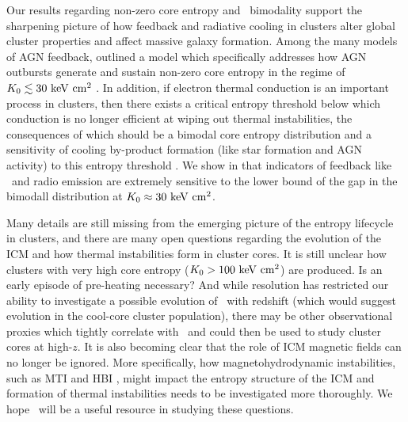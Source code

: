 \documentclass[12pt,preprint]{aastex}
\begin{document}
Our results regarding non-zero core entropy and \kna\ bimodality
support the sharpening picture of how feedback and radiative cooling
in clusters alter global cluster properties and affect massive galaxy
formation. Among the many models of AGN feedback, \citet{agnframework}
outlined a model which specifically addresses how AGN outbursts
generate and sustain non-zero core entropy in the regime of $K_0 \lesssim
30 \mathrm{\mbox{\ensuremath{\mathrm{~keV}}} \mathrm{\mbox{\ensuremath{\mathrm{~cm}}}^2}}$ \citep[see also][]{kaiser03}. In addition, if electron
thermal conduction is an important process in clusters, then there
exists a critical entropy threshold below which conduction is no
longer efficient at wiping out thermal instabilities, the consequences
of which should be a bimodal core entropy distribution and a
sensitivity of cooling by-product formation (like star formation and
AGN activity) to this entropy threshold \citep{conduction,
  2008arXiv0804.3823G}. We show in \citet{haradent} that indicators of
feedback like \halpha\ and radio emission are extremely sensitive to
the lower bound of the gap in the bimodall distribution at $K_0
\approx 30 \mathrm{\mbox{\ensuremath{\mathrm{~keV}}} \mathrm{\mbox{\ensuremath{\mathrm{~cm}}}^2}}$.

Many details are still missing from the emerging picture of the
entropy lifecycle in clusters, and there are many open questions
regarding the evolution of the ICM and how thermal instabilities form
in cluster cores. It is still unclear how clusters with very high core
entropy ($K_0 > 100 \mathrm{\mbox{\ensuremath{\mathrm{~keV}}} \mathrm{\mbox{\ensuremath{\mathrm{~cm}}}^2}}$) are produced. Is an early episode of
pre-heating necessary? And while resolution has restricted our ability
to investigate a possible evolution of \kna\ with redshift (which
would suggest evolution in the cool-core cluster population), there
may be other observational proxies which tightly correlate with
\kna\ and could then be used to study cluster cores at high-$z$. It is
also becoming clear that the role of ICM magnetic fields can no longer
be ignored. More specifically, how magnetohydrodynamic instabilities,
such as MTI \citep{2000ApJ...534..420B, 2008ApJ...673..758Q} and HBI
\citep{2008ApJ...677L...9P}, might impact the entropy structure of the
ICM and formation of thermal instabilities needs to be investigated
more thoroughly. We hope \accept\ will be a useful resource in
studying these questions.

\acknowledgements
\end{document}
